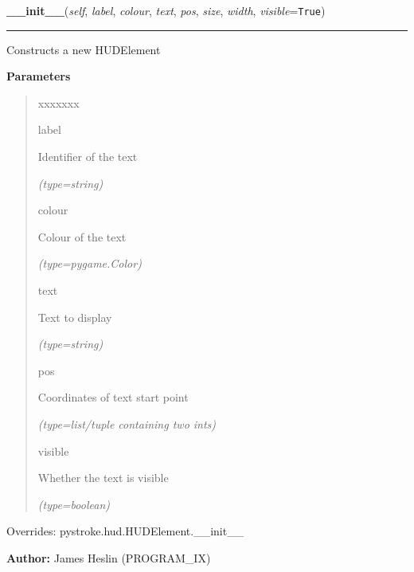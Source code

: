 \hspace{.8\funcindent}\begin{boxedminipage}{\funcwidth}

    \raggedright \textbf{\_\_init\_\_}(\textit{self}, \textit{label}, \textit{colour}, \textit{text}, \textit{pos}, \textit{size}, \textit{width}, \textit{visible}={\tt True})

    \vspace{-1.5ex}

    \rule{\textwidth}{0.5\fboxrule}
\setlength{\parskip}{2ex}
    Constructs a new HUDElement

\setlength{\parskip}{1ex}
      \textbf{Parameters}
      \vspace{-1ex}

      \begin{quote}
        \begin{Ventry}{xxxxxxx}

          \item[label]

          Identifier of the text

            {\it (type=string)}

          \item[colour]

          Colour of the text

            {\it (type=pygame.Color)}

          \item[text]

          Text to display

            {\it (type=string)}

          \item[pos]

          Coordinates of text start point

            {\it (type=list/tuple containing two ints)}

          \item[visible]

          Whether the text is visible

            {\it (type=boolean)}

        \end{Ventry}

      \end{quote}

      Overrides: pystroke.hud.HUDElement.\_\_init\_\_

\textbf{Author:} James Heslin (PROGRAM\_IX)



    \end{boxedminipage}

